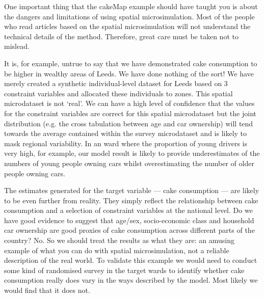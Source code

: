 \documentclass[a4paper, 11pt, twoside]{article}
\begin{document}
One important thing that the cakeMap example should have taught you is
about the dangers and limitations of using spatial microsimulation.
Most of the people who read articles based on the spatial microsimulation
will not understand the technical details of the method. Therefore, great
care must be taken not to mislead.

It is, for example, untrue to say
that we have demonstrated cake consumption to be higher in wealthy areas of Leeds.
We have done nothing of the sort! We have merely created a synthetic individual-level
dataset for Leeds based on 3 constraint variables and allocated these individuals to zones.
This spatial microdataset is not `real'. We can have a high level of confidence that the
values for the constraint variables are correct for this spatial microdataset but the joint distribution
(e.g. the cross tabulation between age and car ownership) will tend towards the average
contained within the survey microdataset and is likely to mask regional variability. In an ward
where the proportion of young drivers is very high, for example, our model result is likely
to provide underestimates of the numbers of young people owning cars whilst overestimating
the number of older people owning cars.

The estimates generated for the target variable --- cake consumption --- are likely to be
even further from reality. They simply reflect the relationship between cake consumption and
a selection of constraint variables at the national level. Do we have good evidence to suggest
that age/sex, socio-economic class and household car ownership are good proxies of cake consumption
across different parts of the country? No. So we should treat the results as what they are:
an amusing example of what you can do with spatial microsimulation, not a reliable description
of the real world. To validate this example we would need to conduct some kind of randomised
survey in the target wards to identify whether cake consumption really does vary in the ways
described by the model. Most likely we would find that it does not.
\end{document}
